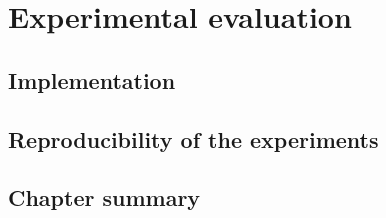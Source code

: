 \chapter{Experimental evaluation}\label{chapter:experimental_evaluation}

\section{Implementation}
\label{sec:implementation}

\section{Reproducibility of the experiments}
\label{sec:reproducibility}



\section{Chapter summary}
